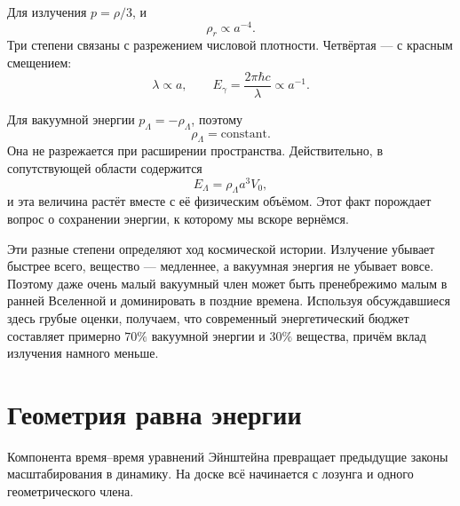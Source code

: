 Для излучения \(p=\rho/3\), и
\begin{equation}
\rho_r\propto a^{-4}.
\end{equation}
Три степени связаны с разрежением числовой плотности. Четвёртая — с красным смещением:
\begin{equation}
\lambda\propto a,
\qquad
E_\gamma=\frac{2\pi\hbar c}{\lambda}\propto a^{-1}.
\end{equation}

\begin{classroomqa}
\end{classroomqa}

Для вакуумной энергии \(p_\Lambda=-\rho_\Lambda\), поэтому
\begin{equation}
\rho_\Lambda=\text{constant}.
\end{equation}
Она не разрежается при расширении пространства. Действительно, в сопутствующей области содержится
\begin{equation}
E_\Lambda=\rho_\Lambda a^3V_0,
\end{equation}
и эта величина растёт вместе с её физическим объёмом. Этот факт порождает вопрос о сохранении энергии, к которому мы вскоре вернёмся.

Эти разные степени определяют ход космической истории. Излучение убывает быстрее всего, вещество — медленнее, а вакуумная энергия не убывает вовсе. Поэтому даже очень малый вакуумный член может быть пренебрежимо малым в ранней Вселенной и доминировать в поздние времена. Используя обсуждавшиеся здесь грубые оценки, получаем, что современный энергетический бюджет составляет примерно \(70\%\) вакуумной энергии и \(30\%\) вещества, причём вклад излучения намного меньше.

\section{Геометрия равна энергии}

Компонента время–время уравнений Эйнштейна превращает предыдущие законы масштабирования в динамику. На доске всё начинается с лозунга и одного геометрического члена.

